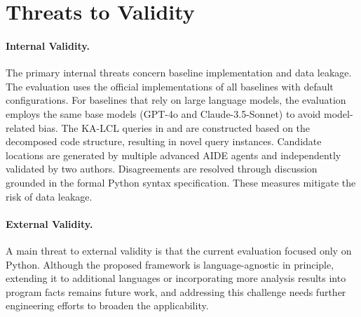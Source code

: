 \section{Threats to Validity}\label{sec:threats-dataloc}

\paragraph{Internal Validity.} 
The primary internal threats concern baseline implementation and data leakage. The evaluation uses the official implementations of all baselines with default configurations. For baselines that rely on large language models, the evaluation employs the same base models (GPT-4o and Claude-3.5-Sonnet) to avoid model-related bias. The KA-LCL queries in \dataset and \negset are constructed based on the decomposed code structure, resulting in novel query instances. Candidate locations are generated by multiple advanced AIDE agents and independently validated by two authors. Disagreements are resolved through discussion grounded in the formal Python syntax specification. These measures mitigate the risk of data leakage.

\paragraph{External Validity.} 
A main threat to external validity is that the current evaluation focused only on Python. Although the proposed framework is language-agnostic in principle, extending it to additional languages or incorporating more analysis results into program facts remains future work, and addressing this challenge needs further engineering efforts to broaden the applicability.
